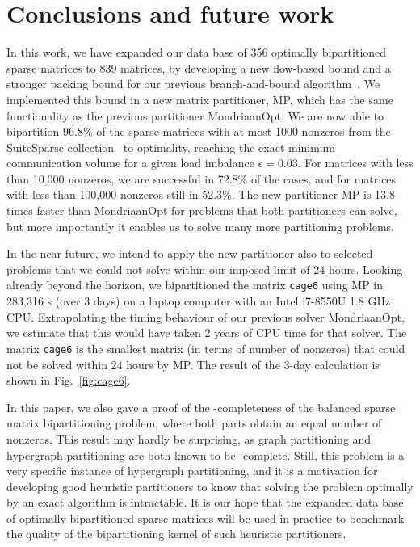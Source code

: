 \section{Conclusions and future work}
\label{sec:concl}
In this work, we have expanded our data base of 356 optimally bipartitioned sparse matrices
to 839 matrices, by developing a new flow-based bound and a stronger packing bound
for our previous branch-and-bound algorithm~\cite{pelt15}.
We implemented this bound in a new matrix partitioner, MP, which has the same functionality as the 
previous partitioner MondriaanOpt.
We are now able to bipartition 96.8\% of the sparse matrices with at most 1000 nonzeros
from the SuiteSparse collection~\cite{davis11}
to optimality, reaching the exact minimum communication volume for a given load imbalance $\epsilon=0.03$. 
For matrices with less than 10,000 nonzeros, we are successful in 72.8\% of the cases,
and for matrices with less than 100,000 nonzeros still in 52.3\%.    
The new partitioner MP is 13.8 times faster than MondriaanOpt for problems that both
partitioners can solve, but more importantly it enables us to solve many more partitioning problems.

In the near future, we intend to apply the new partitioner also to selected  problems that we could not solve
within our imposed limit of 24 hours. Looking already beyond the horizon,
we bipartitioned the matrix \texttt{cage6} using MP in 283,316 s (over 3 days) on a laptop computer
 with an Intel i7-8550U 1.8 GHz CPU.
Extrapolating the timing behaviour of our previous solver MondriaanOpt,
we estimate that this would have taken 2 years of CPU time for that solver.
The matrix \texttt{cage6} is the smallest matrix (in terms of number of nonzeros) that could not be solved within 24 hours
by MP.
The result of the 3-day calculation is shown in Fig.~\ref{fig:cage6}.

In this paper, we also gave a proof of the \NP-completeness of the balanced sparse matrix bipartitioning problem,
where both parts obtain an equal number of nonzeros. This result may hardly be surprising,
as graph partitioning and hypergraph partitioning are both known to be \NP-complete.
Still, this problem is a very specific instance of hypergraph partitioning,
and it is a motivation for developing good heuristic partitioners to know that solving the problem optimally
by an exact algorithm is intractable.
It is our hope that the expanded data base of optimally bipartitioned sparse matrices
will be used in practice to benchmark the quality of
the bipartitioning kernel of such heuristic partitioners.

